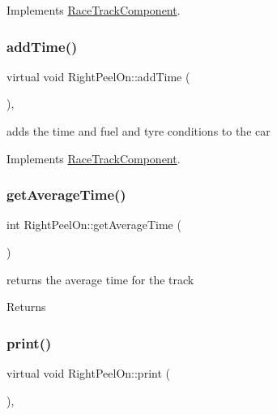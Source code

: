 Implements \mbox{\hyperlink{class_race_track_component_af89a6b453dfd3fb39fce27576012106f}{Race\+Track\+Component}}.

\mbox{\label{class_right_peel_on_aa37e19baf0ca3763e1912f85cbb0949b}} 
\subsubsection{\texorpdfstring{add\+Time()}{addTime()}}
{\footnotesize\ttfamily virtual void Right\+Peel\+On\+::add\+Time (\begin{DoxyParamCaption}{ }\end{DoxyParamCaption})\hspace{0.3cm}{\ttfamily [inline]}, {\ttfamily [virtual]}}

adds the time and fuel and tyre conditions to the car 

Implements \mbox{\hyperlink{class_race_track_component_aa815404c45ba7df3786c3add177eb7e6}{Race\+Track\+Component}}.

\mbox{\label{class_right_peel_on_afdfcc99fb52dfc8363ec063083f1ba1d}} 
\subsubsection{\texorpdfstring{get\+Average\+Time()}{getAverageTime()}}
{\footnotesize\ttfamily int Right\+Peel\+On\+::get\+Average\+Time (\begin{DoxyParamCaption}{ }\end{DoxyParamCaption})\hspace{0.3cm}{\ttfamily [inline]}}

returns the average time for the track \begin{DoxyReturn}{Returns}

\end{DoxyReturn}
\mbox{\label{class_right_peel_on_a6c54c5dbffa104bb96e7b564e854dd74}} 
\subsubsection{\texorpdfstring{print()}{print()}}
{\footnotesize\ttfamily virtual void Right\+Peel\+On\+::print (\begin{DoxyParamCaption}{ }\end{DoxyParamCaption})\hspace{0.3cm}{\ttfamily [inline]}, {\ttfamily [virtual]}}

